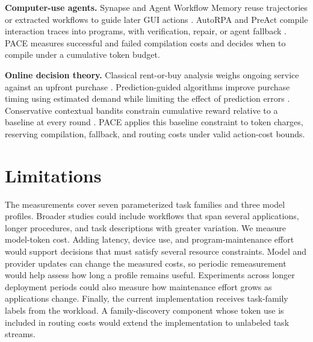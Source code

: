 \textbf{Computer-use agents.}
Synapse and Agent Workflow Memory reuse trajectories or extracted workflows to guide later GUI actions \citep{zheng2024synapse,wang2025awm}.
AutoRPA and PreAct compile interaction traces into programs, with verification, repair, or agent fallback \citep{chen2026autorpa,li2026preact}.
PACE measures successful and failed compilation costs and decides when to compile under a cumulative token budget.

\textbf{Online decision theory.}
Classical rent-or-buy analysis weighs ongoing service against an upfront purchase \citep{karlin1994competitive}.
Prediction-guided algorithms improve purchase timing using estimated demand while limiting the effect of prediction errors \citep{purohit2018improving,gollapudi2019online}.
Conservative contextual bandits constrain cumulative reward relative to a baseline at every round \citep{kazerouni2016conservative}.
PACE applies this baseline constraint to token charges, reserving compilation, fallback, and routing costs under valid action-cost bounds.

\section{Limitations}
\label{sec:limitations}

The measurements cover seven parameterized task families and three model profiles.
Broader studies could include workflows that span several applications, longer procedures, and task descriptions with greater variation.
We measure model-token cost.
Adding latency, device use, and program-maintenance effort would support decisions that must satisfy several resource constraints.
Model and provider updates can change the measured costs, so periodic remeasurement would help assess how long a profile remains useful.
Experiments across longer deployment periods could also measure how maintenance effort grows as applications change.
Finally, the current implementation receives task-family labels from the workload.
A family-discovery component whose token use is included in routing costs would extend the implementation to unlabeled task streams.


\FloatBarrier
\label{main:text-end}




\clearpage
\appendix
\raggedbottom
{}

